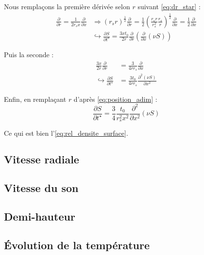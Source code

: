 Nous remplaçons la première dérivée selon $r$ suivant \eqref{eq:dr_star} :
\begin{align}
    \frac{\partial}{\partial r} = \frac{1}{2 r_s x} \frac{\partial}{\partial x}
    &\Rightarrow (r_s r)^\frac{1}{2} \frac{\partial}{\partial r} = \frac{1}{2} \left( \frac{r_s r}{r_s^2} \frac{r_s}{r} \right)^\frac{1}{2} \frac{\partial}{\partial x}
                                                                = \frac{1}{2} \frac{\partial}{\partial x} \\
    &\hookrightarrow \frac{\partial S}{\partial t^\star} = \frac{3 x t_0}{2 r} \frac{\partial}{\partial r} \left( \frac{\partial}{\partial x} \left( \nu S \right) \right)
\end{align}

Puis la seconde :
\begin{align}
    \frac{3 x}{2 r} \frac{\partial}{\partial r} &= \frac{3}{4 r r_s} \frac{\partial}{\partial x} \\
    \hookrightarrow \frac{\partial S}{\partial t^\star} &= \frac{3 t_0}{4 r r_s} \frac{\partial^2 (\nu S)}{\partial x^2}
\end{align}

Enfin, en remplaçant $r$ d’après \eqref{eq:position_adim} :
\begin{equation}
    \frac{\partial S}{\partial t^\star} = \frac{3}{4} \frac{t_0}{r_s^2 x^2} \frac{\partial^2}{\partial x^2} \left(\nu S\right)
\end{equation}

Ce qui est bien l’\cref{eq:rel_densite_surface}.

\subsection{Vitesse radiale}

\subsection{Vitesse du son}

\subsection{Demi-hauteur}

\subsection{Évolution de la température}


